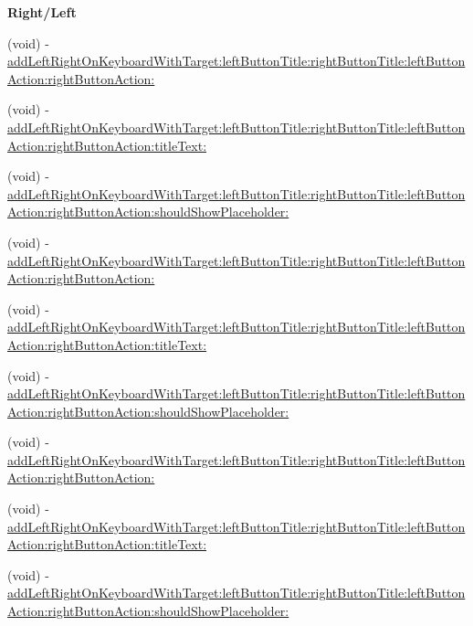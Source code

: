 \begin{Indent}\textbf{ Right/\+Left}\par
{\em 

 

 }\begin{DoxyCompactItemize}
\item 
(void) -\/ \mbox{\hyperlink{category_u_i_view_07_i_q_toolbar_addition_08_ab8f78f53bafb40a3c17d92a8412a8f6e}{add\+Left\+Right\+On\+Keyboard\+With\+Target\+:left\+Button\+Title\+:right\+Button\+Title\+:left\+Button\+Action\+:right\+Button\+Action\+:}}
\item 
(void) -\/ \mbox{\hyperlink{category_u_i_view_07_i_q_toolbar_addition_08_ad4b58abd45c805aa7ba8500b26309ca0}{add\+Left\+Right\+On\+Keyboard\+With\+Target\+:left\+Button\+Title\+:right\+Button\+Title\+:left\+Button\+Action\+:right\+Button\+Action\+:title\+Text\+:}}
\item 
(void) -\/ \mbox{\hyperlink{category_u_i_view_07_i_q_toolbar_addition_08_a8dd900621129cdec7c57f4792e66acfc}{add\+Left\+Right\+On\+Keyboard\+With\+Target\+:left\+Button\+Title\+:right\+Button\+Title\+:left\+Button\+Action\+:right\+Button\+Action\+:should\+Show\+Placeholder\+:}}
\item 
(void) -\/ \mbox{\hyperlink{category_u_i_view_07_i_q_toolbar_addition_08_ab8f78f53bafb40a3c17d92a8412a8f6e}{add\+Left\+Right\+On\+Keyboard\+With\+Target\+:left\+Button\+Title\+:right\+Button\+Title\+:left\+Button\+Action\+:right\+Button\+Action\+:}}
\item 
(void) -\/ \mbox{\hyperlink{category_u_i_view_07_i_q_toolbar_addition_08_ad4b58abd45c805aa7ba8500b26309ca0}{add\+Left\+Right\+On\+Keyboard\+With\+Target\+:left\+Button\+Title\+:right\+Button\+Title\+:left\+Button\+Action\+:right\+Button\+Action\+:title\+Text\+:}}
\item 
(void) -\/ \mbox{\hyperlink{category_u_i_view_07_i_q_toolbar_addition_08_a8dd900621129cdec7c57f4792e66acfc}{add\+Left\+Right\+On\+Keyboard\+With\+Target\+:left\+Button\+Title\+:right\+Button\+Title\+:left\+Button\+Action\+:right\+Button\+Action\+:should\+Show\+Placeholder\+:}}
\item 
(void) -\/ \mbox{\hyperlink{category_u_i_view_07_i_q_toolbar_addition_08_ab8f78f53bafb40a3c17d92a8412a8f6e}{add\+Left\+Right\+On\+Keyboard\+With\+Target\+:left\+Button\+Title\+:right\+Button\+Title\+:left\+Button\+Action\+:right\+Button\+Action\+:}}
\item 
(void) -\/ \mbox{\hyperlink{category_u_i_view_07_i_q_toolbar_addition_08_ad4b58abd45c805aa7ba8500b26309ca0}{add\+Left\+Right\+On\+Keyboard\+With\+Target\+:left\+Button\+Title\+:right\+Button\+Title\+:left\+Button\+Action\+:right\+Button\+Action\+:title\+Text\+:}}
\item 
(void) -\/ \mbox{\hyperlink{category_u_i_view_07_i_q_toolbar_addition_08_a8dd900621129cdec7c57f4792e66acfc}{add\+Left\+Right\+On\+Keyboard\+With\+Target\+:left\+Button\+Title\+:right\+Button\+Title\+:left\+Button\+Action\+:right\+Button\+Action\+:should\+Show\+Placeholder\+:}}
\end{DoxyCompactItemize}
\end{Indent}
